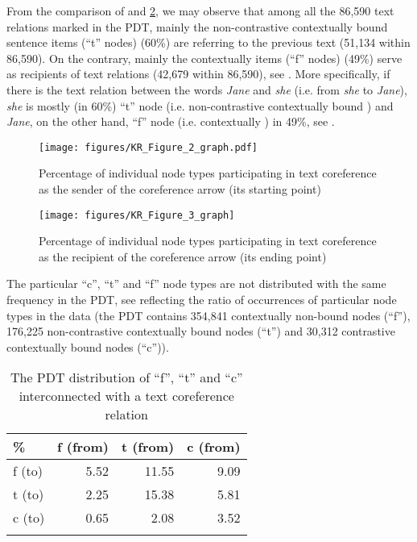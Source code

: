 \documentclass[output=paper]{langsci/langscibook.cls}
\begin{document}
From the comparison of  and \ref{rysova_k:fig:3}, we may observe that among all the 86,590 text  relations marked in the PDT, mainly the non-contrastive contextually bound sentence items (``t'' nodes) (60\%) are referring to the previous text (51,134 within 86,590). On the contrary, mainly the contextually  items (``f'' nodes) (49\%) serve as recipients of text  relations (42,679 within 86,590), see . More specifically, if there is the  text relation between the words \textit{Jane} and\textit{ she} (i.e. from \textit{she} to \textit{Jane}), \textit{she} is mostly (in 60\%) ``t'' node (i.e. non-contrastive contextually bound ) and\textit{ Jane}, on the other hand, ``f'' node (i.e. contextually ) in 49\%, see .

\begin{figure} 
\texttt{[image: figures/KR\_Figure\_2\_graph.pdf]}
\caption{Percentage of individual node types participating in text coreference as the sender of the coreference arrow (its starting point)}
\label{rysova_k:fig:2}
\end{figure}


\begin{figure}
\texttt{[image: figures/KR\_Figure\_3\_graph]}
\caption{Percentage of individual node types participating in text coreference as the recipient of the coreference arrow (its ending point)}
\label{rysova_k:fig:3}
\end{figure}


The particular ``c'', ``t'' and ``f'' node types are not distributed with the same frequency in the PDT, see  reflecting the ratio of occurrences of particular node types in the data (the PDT contains 354,841 contextually non-bound nodes (``f''), 176,225 non-contrastive contextually bound nodes (``t'') and 30,312 contrastive contextually bound nodes (``c'')).



\begin{table}
\caption{The PDT distribution of ``f'', ``t'' and ``c'' interconnected with a text coreference relation}
\begin{tabularx}{\textwidth}{Xrrr}
\lsptoprule
\% &
f (from) &
t (from) &
c (from)\\ 
\midrule
f (to) &
5.52 &
11.55 &
9.09\\ 
t (to) &
2.25 &
15.38 &
5.81\\ 
c (to) &
0.65 &
2.08 &
3.52\\
\lspbottomrule
\end{tabularx}
\label{rysova_k:tab:2}
\end{table}
\end{document}
